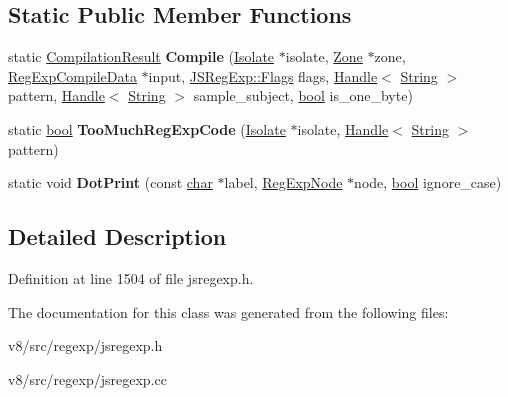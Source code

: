 \subsection*{Static Public Member Functions}
\begin{DoxyCompactItemize}
\item 
\mbox{\label{classv8_1_1internal_1_1RegExpEngine_a9c28fafe897960e4414af1f5f8e69036}} 
static \mbox{\hyperlink{structv8_1_1internal_1_1RegExpEngine_1_1CompilationResult}{Compilation\+Result}} {\bfseries Compile} (\mbox{\hyperlink{classv8_1_1internal_1_1Isolate}{Isolate}} $\ast$isolate, \mbox{\hyperlink{classv8_1_1internal_1_1Zone}{Zone}} $\ast$zone, \mbox{\hyperlink{structv8_1_1internal_1_1RegExpCompileData}{Reg\+Exp\+Compile\+Data}} $\ast$input, \mbox{\hyperlink{classv8_1_1base_1_1Flags}{J\+S\+Reg\+Exp\+::\+Flags}} flags, \mbox{\hyperlink{classv8_1_1internal_1_1Handle}{Handle}}$<$ \mbox{\hyperlink{classv8_1_1internal_1_1String}{String}} $>$ pattern, \mbox{\hyperlink{classv8_1_1internal_1_1Handle}{Handle}}$<$ \mbox{\hyperlink{classv8_1_1internal_1_1String}{String}} $>$ sample\+\_\+subject, \mbox{\hyperlink{classbool}{bool}} is\+\_\+one\+\_\+byte)
\item 
\mbox{\label{classv8_1_1internal_1_1RegExpEngine_ac5ef7179d9c31d74c77fab45d87e44a1}} 
static \mbox{\hyperlink{classbool}{bool}} {\bfseries Too\+Much\+Reg\+Exp\+Code} (\mbox{\hyperlink{classv8_1_1internal_1_1Isolate}{Isolate}} $\ast$isolate, \mbox{\hyperlink{classv8_1_1internal_1_1Handle}{Handle}}$<$ \mbox{\hyperlink{classv8_1_1internal_1_1String}{String}} $>$ pattern)
\item 
\mbox{\label{classv8_1_1internal_1_1RegExpEngine_abcda5d365182e49c9cd24569efb13d7b}} 
static void {\bfseries Dot\+Print} (const \mbox{\hyperlink{classchar}{char}} $\ast$label, \mbox{\hyperlink{classv8_1_1internal_1_1RegExpNode}{Reg\+Exp\+Node}} $\ast$node, \mbox{\hyperlink{classbool}{bool}} ignore\+\_\+case)
\end{DoxyCompactItemize}


\subsection{Detailed Description}


Definition at line 1504 of file jsregexp.\+h.



The documentation for this class was generated from the following files\+:\begin{DoxyCompactItemize}
\item 
v8/src/regexp/jsregexp.\+h\item 
v8/src/regexp/jsregexp.\+cc\end{DoxyCompactItemize}
